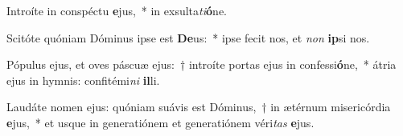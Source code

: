 \item Introíte in conspéctu \textbf{e}jus,~* in exsulta\textit{ti}\textbf{ó}ne.
\item Scitóte quóniam Dóminus ipse est \textbf{De}us:~* ipse fecit nos, et \textit{non} \textbf{ip}si nos.
\item Pópulus ejus, et oves páscuæ ejus:~† introíte portas ejus in confessi\textbf{ó}ne,~* átria ejus in hymnis: confitémi\textit{ni} \textbf{il}li.
\item Laudáte nomen ejus: quóniam suávis est Dóminus,~† in ætérnum misericórdia \textbf{e}jus,~* et usque in generatiónem et generatiónem véri\textit{tas} \textbf{e}jus.
